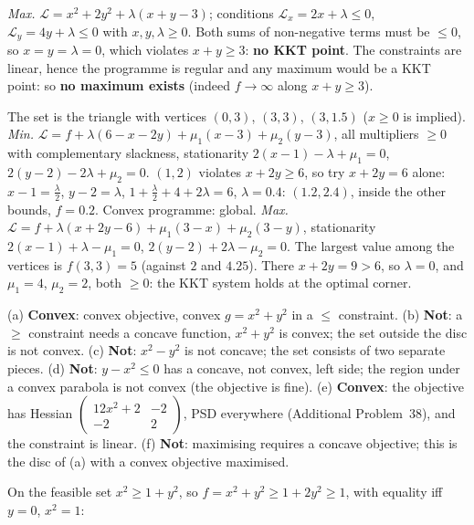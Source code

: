 \begin{solutions}
        \emph{Max.} $\mathcal{L}=x^{2}+2y^{2}+\lambda(x+y-3)$; conditions
        $\mathcal{L}_x=2x+\lambda\le0$, $\mathcal{L}_y=4y+\lambda\le0$ with
        $x,y,\lambda\ge0$. Both sums of non-negative terms must be $\le0$,
        so $x=y=\lambda=0$, which violates $x+y\ge3$: \textbf{no KKT point}.
        The constraints are linear, hence the programme is regular and any
        maximum would be a KKT point: so \textbf{no maximum exists} (indeed
        $f\to\infty$ along $x+y\ge3$).
  \item The set is the triangle with vertices $(0,3)$, $(3,3)$, $(3,1.5)$
        ($x\ge0$ is implied).
        \emph{Min.} $\mathcal{L}=f+\lambda(6-x-2y)+\mu_1(x-3)+\mu_2(y-3)$,
        all multipliers $\ge0$ with complementary slackness, stationarity
        $2(x-1)-\lambda+\mu_1=0$, $2(y-2)-2\lambda+\mu_2=0$. $(1,2)$ violates
        $x+2y\ge6$, so try $x+2y=6$ alone: $x-1=\tfrac\lambda2$,
        $y-2=\lambda$, $1+\tfrac\lambda2+4+2\lambda=6$, $\lambda=0.4$:
        $(1.2,2.4)$, inside the other bounds, $f=0.2$. Convex programme:
        global.
        \emph{Max.} $\mathcal{L}=f+\lambda(x+2y-6)+\mu_1(3-x)+\mu_2(3-y)$,
        stationarity $2(x-1)+\lambda-\mu_1=0$, $2(y-2)+2\lambda-\mu_2=0$. The
        largest value among the vertices is $f(3,3)=5$ (against $2$ and
        $4.25$). There $x+2y=9>6$, so $\lambda=0$, and $\mu_1=4$, $\mu_2=2$,
        both $\ge0$: the KKT system holds at the optimal corner.
  \item (a) \textbf{Convex}: convex objective, convex $g=x^{2}+y^{2}$ in a
        $\le$ constraint. (b) \textbf{Not}: a $\ge$ constraint needs a
        concave function, $x^{2}+y^{2}$ is convex; the set outside the disc
        is not convex. (c) \textbf{Not}: $x^{2}-y^{2}$ is not concave; the
        set consists of two separate pieces. (d) \textbf{Not}: $y-x^{2}\le0$
        has a concave, not convex, left side; the region under a convex
        parabola is not convex (the objective is fine). (e)
        \textbf{Convex}: the objective has Hessian
        $\begin{pmatrix}12x^{2}+2&-2\\-2&2\end{pmatrix}$, PSD everywhere
        (Additional Problem~38), and the constraint is linear. (f)
        \textbf{Not}: maximising requires a concave objective; this is
        the disc of (a) with a convex objective maximised.
  \item On the feasible set $x^{2}\ge1+y^{2}$, so
        $f=x^{2}+y^{2}\ge1+2y^{2}\ge1$, with equality iff $y=0$, $x^{2}=1$:

\end{solutions}
